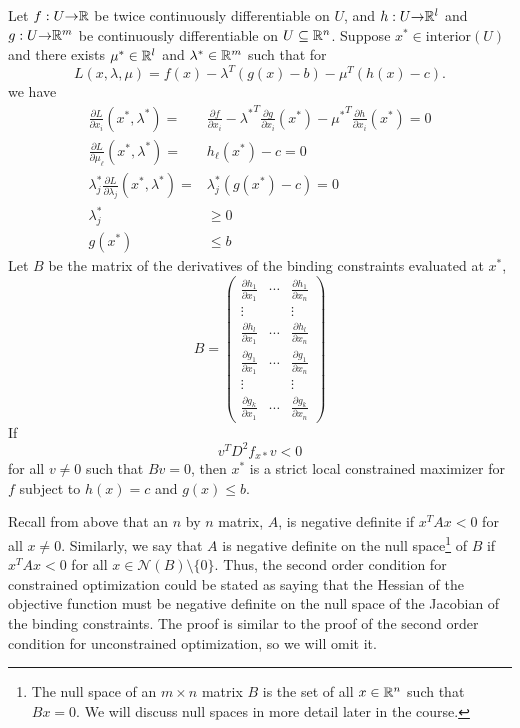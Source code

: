 \begin{theorem}
  Let $f:U {\rightarrow} \mathbb{R}$ be twice continuously
  differentiable on $U$, and $h:U {\rightarrow} \mathbb{R}^l$ and $g: U {\rightarrow} \mathbb{R}^m$ be
  continuously differentiable on $U \subseteq \mathbb{R}^n$. Suppose $x^* \in    
  \mathrm{interior}(U)$ and there exists
  $\mu^* \in \mathbb{R}^l$ and $\lambda^* \in \mathbb{R}^m$ such that for 
  \[ L(x,\lambda,\mu) = f(x) - \lambda^T (g(x) - b) - \mu^T(h(x) - c). \]
  we have
  \begin{align*}
    \frac{\partial L}{\partial x_i}(x^*,\lambda^*) = & \frac{\partial
      f}{\partial x_i} - {\lambda^*}^T \frac{\partial g}{\partial
      x_i}(x^*) - {\mu^*}^T \frac{\partial h}{\partial x_i}(x^*)= 0 \\
    \frac{\partial L}{\partial \mu_\ell}(x^*,\lambda^*) = & h_\ell(x^*) - c = 0 \\
    \lambda_j^* \frac{\partial L}{\partial \lambda_j}(x^*,\lambda^*) =
    & \lambda_j^* \left(g(x^*) - c \right)= 0 \\
    \lambda_j^* & \geq 0 \\
    g(x^*) & \leq b
  \end{align*}
  Let $B$ be the matrix of the derivatives of the binding constraints
  evaluated at $x^*$,
  \[ B = \begin{pmatrix} 
    \frac{\partial h_1}{\partial x_1} &  \cdots &\frac{\partial
      h_1}{\partial x_n}  \\
    \vdots & & \vdots \\
    \frac{\partial h_l}{\partial x_1} &  \cdots &\frac{\partial
      h_l}{\partial x_n}  \\    
    \frac{\partial g_1}{\partial x_1} &  \cdots &\frac{\partial
      g_1}{\partial x_n}  \\ 
    \vdots & & \vdots \\
    \frac{\partial g_k}{\partial x_1} &  \cdots &\frac{\partial
      g_k}{\partial x_n}  
  \end{pmatrix}
  \]
  If 
  \[ v^T D^2 f_{x*} v < 0 \]
  for all $v \neq 0$ such that $B v = 0$, then $x^*$ is a strict
  local constrained maximizer for $f$ subject to $h(x) = c$ and $g(x)
  \leq b$. 
\end{theorem}
Recall from above that an $n$ by $n$ matrix, $A$, is negative definite
if $x^T A x < 0$ for all $x \neq 0$. Similarly, we say that $A$ is
negative definite on the null space\footnote{The null space of an $m
  \times n$ matrix $B$ is the set of all $x \in \mathbb{R}^n$ such that $Bx =
  0$. We will discuss null spaces in more detail later in the course.}
of $B$ if $x^T A x < 0$ for all $x \in \mathcal{N}(B)
\setminus\{0\}$. Thus, the second order condition for constrained
optimization could be stated as saying that the Hessian of the
objective function must be negative definite on the null space of the
Jacobian of the binding constraints. The proof is similar to the proof
of the second order condition for unconstrained optimization, so we
will omit it. 



